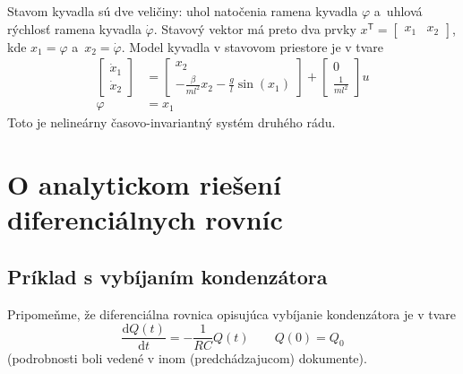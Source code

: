 \documentclass[a4paper, 10pt, ]{article}
\begin{document}
Stavom kyvadla sú dve veličiny: uhol natočenia ramena kyvadla $\varphi$ a~uhlová rýchlosť ramena kyvadla $\dot\varphi$. Stavový vektor má preto dva prvky $x^{\mathsf{T}} = \begin{bmatrix} x_1 & x_2	\end{bmatrix}$, kde $x_1 = \varphi$ a~$x_2 = \dot\varphi$. Model kyvadla v stavovom priestore je v tvare
\begin{subequations}
	\begin{align}
		\begin{bmatrix}
			\dot{x}_1 \\ \dot{x}_2
		\end{bmatrix}
		&=
		\begin{bmatrix}
			x_2 \\ - \frac{\beta}{ml^2} x_2 - \frac{g}{l} \sin(x_1)
		\end{bmatrix}
		+
		\begin{bmatrix}
			0 \\ \frac{1}{ml^2}
		\end{bmatrix}
		u \\
		\varphi &= x_1
	\end{align}
\end{subequations}
Toto je nelineárny časovo-invariantný systém druhého rádu.



















\section{O analytickom riešení diferenciálnych rovníc}



\subsection{Príklad s vybíjaním kondenzátora}

Pripomeňme, že diferenciálna rovnica opisujúca vybíjanie kondenzátora je v tvare
\begin{equation} \label{diffRbeta}
    \frac{\text{d}Q(t)}{\text{d}t} = - \frac{1}{RC} Q(t) \qquad Q(0) = Q_0
\end{equation}
(podrobnosti boli vedené v inom (predchádzajucom) dokumente).
\end{document}
